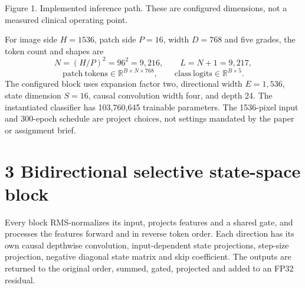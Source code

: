 \documentclass[10pt,a4paper]{article}
\begin{document}
\begin{center}

{\small\color{muted}Figure 1. Implemented inference path. These are configured
dimensions, not a measured clinical operating point.}
\end{center}

For image side $H=1536$, patch side $P=16$, width $D=768$ and five grades,
the token count and shapes are
\[
N=(H/P)^2=96^2=9{,}216,\qquad L=N+1=9{,}217,
\]
\[
\mathrm{patch\ tokens}\in\mathbb{R}^{B\times N\times768},\qquad
\mathrm{class\ logits}\in\mathbb{R}^{B\times5}.
\]
The configured block uses expansion factor two, directional width $E=1{,}536$,
state dimension $S=16$, causal convolution width four, and depth 24. The
instantiated classifier has 103,760,645 trainable parameters. The
1536-pixel input and 300-epoch schedule are project choices, not settings
mandated by the paper or assignment brief.

\newpage
\section*{\color{ink}3 \quad Bidirectional selective state-space block}
Every block RMS-normalizes its input, projects features and a shared gate,
and processes the features forward and in reverse token order. Each
direction has its own causal depthwise convolution, input-dependent
state projections, step-size projection, negative diagonal state matrix
and skip coefficient. The outputs are returned to the original order,
summed, gated, projected and added to an FP32 residual.
\end{document}
